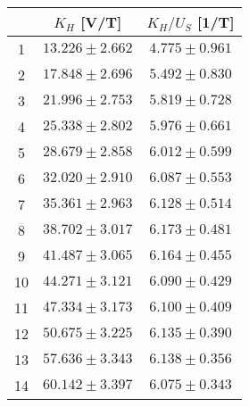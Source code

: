 \begin{tabular}{|c|c|c|}
\hline
& $K_H$ [V/T] & $K_H/U_S$ [1/T] \\
\hline
1	&	$13.226\pm2.662$	&	$4.775\pm0.961$	\\
\hline
2	&	$17.848\pm2.696$	&	$5.492\pm0.830$	\\
\hline
3	&	$21.996\pm2.753$	&	$5.819\pm0.728$	\\
\hline
4	&	$25.338\pm2.802$	&	$5.976\pm0.661$	\\
\hline
5	&	$28.679\pm2.858$	&	$6.012\pm0.599$	\\
\hline
6	&	$32.020\pm2.910$	&	$6.087\pm0.553$	\\
\hline
7	&	$35.361\pm2.963$	&	$6.128\pm0.514$	\\
\hline
8	&	$38.702\pm3.017$	&	$6.173\pm0.481$	\\
\hline
9	&	$41.487\pm3.065$	&	$6.164\pm0.455$	\\
\hline
10	&	$44.271\pm3.121$	&	$6.090\pm0.429$	\\
\hline
11	&	$47.334\pm3.173$	&	$6.100\pm0.409$	\\
\hline
12	&	$50.675\pm3.225$	&	$6.135\pm0.390$	\\
\hline
13	&	$57.636\pm3.343$	&	$6.138\pm0.356$	\\
\hline
14	&	$60.142\pm3.397$	&	$6.075\pm0.343$	\\
\hline
\end{tabular}
